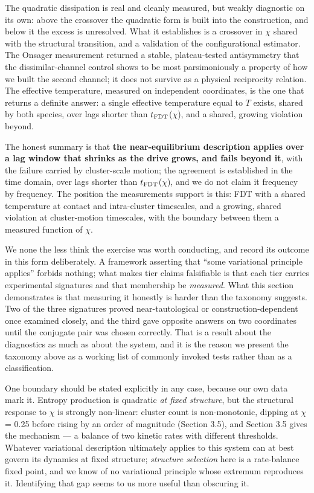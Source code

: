 \documentclass[aps,pre,preprint,superscriptaddress,nofootinbib,longbibliography]{revtex4-2}
\begin{document}
The quadratic dissipation is real and cleanly measured, but weakly diagnostic on its own: above the crossover the quadratic form is built into the construction, and below it the excess is unresolved. What it establishes is a crossover in $\chi$ shared with the structural transition, and a validation of the configurational estimator. The Onsager measurement returned a stable, plateau-tested antisymmetry that the dissimilar-channel control shows to be most parsimoniously a property of how we built the second channel; it does not survive as a physical reciprocity relation. The effective temperature, measured on independent coordinates, is the one that returns a definite answer: a single effective temperature equal to $T$ exists, shared by both species, over lags shorter than $t_{\rm FDT}$($\chi$), and a shared, growing violation beyond.

The honest summary is that \textbf{the near-equilibrium description applies over a lag window that shrinks as the drive grows, and fails beyond it}, with the failure carried by cluster-scale motion; the agreement is established in the time domain, over lags shorter than $t_{\rm FDT}$($\chi$), and we do not claim it frequency by frequency. The position the measurements support is this: FDT with a shared temperature at contact and intra-cluster timescales, and a growing, shared violation at cluster-motion timescales, with the boundary between them a measured function of $\chi$.

We none the less think the exercise was worth conducting, and record its outcome in this form deliberately. A framework asserting that ``some variational principle applies'' forbids nothing; what makes tier claims falsifiable is that each tier carries experimental signatures and that membership be \emph{measured}. What this section demonstrates is that measuring it honestly is harder than the taxonomy suggests. Two of the three signatures proved near-tautological or construction-dependent once examined closely, and the third gave opposite answers on two coordinates until the conjugate pair was chosen correctly. That is a result about the diagnostics as much as about the system, and it is the reason we present the taxonomy above as a working list of commonly invoked tests rather than as a classification.

One boundary should be stated explicitly in any case, because our own data mark it. Entropy production is quadratic \emph{at fixed structure}, but the structural response to $\chi$ is strongly non-linear: cluster count is non-monotonic, dipping at $\chi$ = 0.25 before rising by an order of magnitude (Section 3.5), and Section 3.5 gives the mechanism --- a balance of two kinetic rates with different thresholds. Whatever variational description ultimately applies to this system can at best govern its dynamics at fixed structure; \emph{structure selection} here is a rate-balance fixed point, and we know of no variational principle whose extremum reproduces it. Identifying that gap seems to us more useful than obscuring it.
\end{document}
